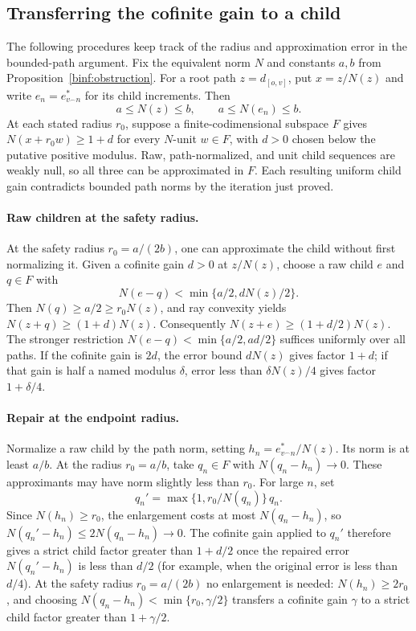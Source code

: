 \subsection{Transferring the cofinite gain to a child}
\label{binf:transfer-comparisons}

The following procedures keep track of the radius and approximation error
in the bounded-path argument. Fix the equivalent norm $N$ and constants
$a,b$ from Proposition~\ref{binf:obstruction}. For a root path
$z=d_{[o,v]}$, put $x=z/N(z)$ and write $e_n=e_{v^\frown n}^*$
for its child increments. Then
\[
 a\le N(z)\le b,\qquad a\le N(e_n)\le b.
\]
At each stated radius $r_0$, suppose a finite-codimensional subspace $F$
gives $N(x+r_0w)\ge1+d$ for every $N$-unit $w\in F$, with $d>0$
chosen below the putative positive modulus. Raw, path-normalized, and
unit child sequences are weakly null, so all three can be approximated
in $F$. Each resulting uniform child gain contradicts bounded path norms
by the iteration just proved.

\paragraph{Raw children at the safety radius.}
At the safety radius $r_0=a/(2b)$, one can approximate the child
without first normalizing it.
Given a cofinite gain $d>0$ at $z/N(z)$, choose a raw child $e$ and
$q\in F$ with
\begin{equation}\label{binf:raw-error}
 N(e-q)<\min\{a/2,dN(z)/2\}.
\end{equation}
Then $N(q)\ge a/2\ge r_0N(z)$, and ray convexity yields
$N(z+q)\ge(1+d)N(z)$. Consequently
$N(z+e)\ge(1+d/2)N(z)$. The stronger restriction
$N(e-q)<\min\{a/2,ad/2\}$ suffices uniformly over all paths.
If the cofinite gain is $2d$, the error bound $dN(z)$ gives factor
$1+d$; if that gain is half a named modulus $\delta$, error less
than $\delta N(z)/4$ gives factor $1+\delta/4$.

\paragraph{Repair at the endpoint radius.}
Normalize a raw child by the path norm, setting
$h_n=e_{v^\frown n}^*/N(z)$. Its norm is at least $a/b$. At the
radius $r_0=a/b$, take $q_n\in F$ with $N(q_n-h_n)\to0$.
These approximants may have norm slightly less than $r_0$. For large
$n$, set
\begin{equation}\label{binf:radial-repair}
 q_n'=\max\{1,r_0/N(q_n)\}\,q_n.
\end{equation}
Since $N(h_n)\ge r_0$, the enlargement costs at most
$N(q_n-h_n)$, so $N(q_n'-h_n)\le2N(q_n-h_n)\to0$.
The cofinite gain applied to $q_n'$ therefore gives a strict child
factor greater than $1+d/2$ once the repaired error
$N(q_n'-h_n)$ is less than $d/2$ (for example, when the original
error is less than $d/4$).
At the safety radius $r_0=a/(2b)$ no enlargement is needed:
$N(h_n)\ge2r_0$, and choosing
$N(q_n-h_n)<\min\{r_0,\gamma/2\}$ transfers a cofinite gain
$\gamma$ to a strict child factor greater than $1+\gamma/2$.

